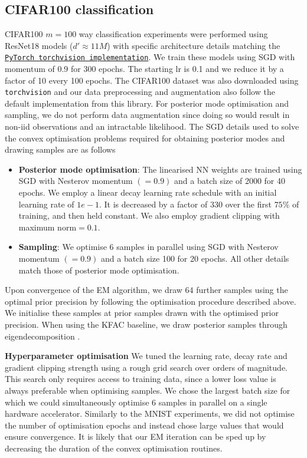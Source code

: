 \subsection{CIFAR100 classification}
\label{app:cifar100_experiments}
CIFAR100 $m{=}100$ way classification experiments were performed using ResNet18 models ($d'\approx 11M$) with specific architecture details matching the \href{https://pytorch.org/vision/main/models.html}{\texttt{PyTorch torchvision implementation}}. We train these models using SGD with momentum of 0.9 for 300 epochs. The starting lr is 0.1 and we reduce it by a factor of 10 every 100 epochs. The CIFAR100 dataset was also downloaded using \texttt{torchvision} and our data preprocessing and augmentation also follow the default implementation from this library. For posterior mode optimisation and sampling, we do not perform data augmentation since doing so would result in non-iid  observations and an intractable likelihood.
The SGD details used to solve the convex optimisation problems required for obtaining posterior modes and drawing samples are as follows
\begin{itemize}
    \item \textbf{Posterior mode optimisation}: The linearised NN weights are trained using SGD with Nesterov momentum $({=}0.9)$ and a batch size of 2000 for 40 epochs. We employ a linear decay learning rate schedule with an initial learning rate of $1e{-}1$. It is decreased by a factor of $330$ over the first $75\%$ of training, and then held constant. We also employ gradient clipping with maximum norm$=0.1$.
    \item \textbf{Sampling}: We optimise $6$ samples in parallel using SGD with Nesterov momentum $({=}0.9)$ and a batch size 100 for 20 epochs. All other details match those of posterior mode optimisation. 
\end{itemize}
Upon convergence of the EM algorithm, we draw $64$ further samples using the optimal prior precision by following the optimisation procedure described above. We initialise these samples at prior samples drawn with the optimised prior precision. When using the KFAC baseline, we draw posterior samples through eigendecomposition \citep{daxberger2021laplace}.

\textbf{Hyperparameter optimisation} We tuned the learning rate, decay rate and gradient clipping strength using a rough grid search over orders of magnitude. This search only requires access to training data, since a lower loss value is always preferable when optimising samples. We chose the largest batch size for which we could simultaneously optimise $6$ samples in parallel on a single hardware accelerator. Similarly to the MNIST experiments, we did not optimise the number of optimisation epochs and instead chose large values that would ensure convergence. It is likely that our EM iteration can be sped up by decreasing the duration of the convex optimisation routines.

